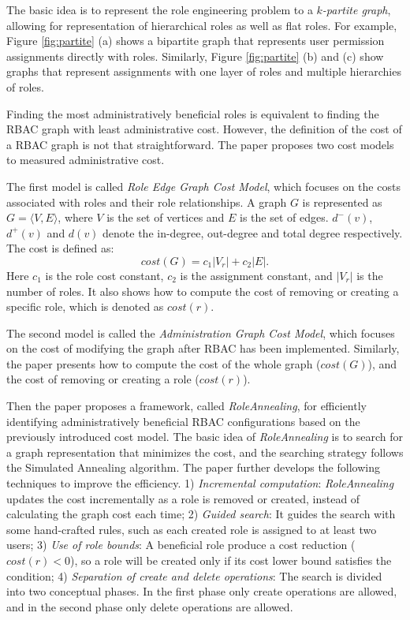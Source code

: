 \documentclass[paper=a4, fontsize=18pt]{article} %
\numberwithin{equation}{section} %
\numberwithin{figure}{section} %
\numberwithin{table}{section} %
\begin{document}
The basic idea is to represent the role engineering problem to a \emph{$k$-partite graph}, allowing for representation of hierarchical roles as well as flat roles. For example, Figure \ref{fig:partite} (a) shows a bipartite graph that represents user permission assignments directly with roles. Similarly, Figure \ref{fig:partite} (b) and (c) show graphs that represent assignments with one layer of roles and multiple hierarchies of roles.

Finding the most administratively beneficial roles is equivalent to finding the RBAC graph with least administrative cost. However, the definition of the cost of a RBAC graph is not that straightforward. The paper proposes two cost models to measured administrative cost.

The first model is called \emph{Role Edge Graph Cost Model}, which focuses on the costs associated with roles and their  role relationships. A graph $G$ is represented as $G = \langle V, E \rangle$, where $V$ is the set of vertices and $E$ is the set of edges. $d^-(v)$, $d^+(v)$ and $d(v)$ denote the in-degree, out-degree and total degree respectively. The cost is defined as:
$$cost(G) = c_1 |V_r| + c_2 |E|.$$
Here $c_1$ is the role cost constant, $c_2$ is the assignment constant, and $|V_r|$ is the number of roles. It also shows how to compute the cost of removing or creating a specific role, which is denoted as $cost(r)$.

The second model is called the \emph{Administration Graph Cost Model}, which focuses on the cost of modifying the graph after RBAC has been implemented. Similarly, the paper presents how to compute the cost of the whole graph ($cost(G)$), and the cost of removing or creating a role ($cost(r)$).

Then the paper proposes a framework, called \emph{RoleAnnealing}, for efficiently identifying administratively beneficial RBAC configurations based on the previously introduced cost model. The basic idea of \emph{RoleAnnealing} is to search for a graph representation that minimizes the cost, and the searching strategy follows the Simulated Annealing algorithm. The paper further develops the following techniques to improve the efficiency. 1) \emph{Incremental computation}: \emph{RoleAnnealing} updates the cost incrementally as a role is removed or created, instead of calculating the graph cost each time; 2) \emph{Guided search}: It guides the search with some hand-crafted rules, such as each created role is assigned to at least two users; 3) \emph{Use of role bounds}: A beneficial role produce a cost reduction ($cost(r)<0$), so a role will be created only if its cost lower bound satisfies the condition; 4) \emph{Separation of create and delete operations}: The search is divided into two conceptual phases. In the first phase only create operations are allowed, and in the second phase only delete operations are allowed.
\end{document}
